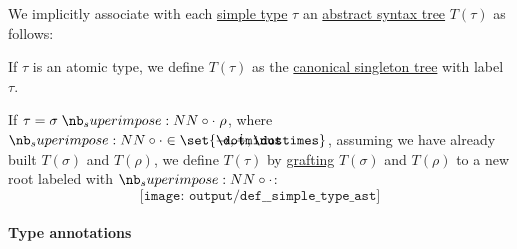 \begin{definition}\label{def:simple_type_ast}\mimprovised
  We implicitly associate with each \hyperref[def:simple_type]{simple type} \( \tau \) an \hyperref[con:abstract_syntax_tree]{abstract syntax tree} \( T(\tau) \) as follows:
  \begin{thmenum}
     If \( \tau \) is an atomic type, we define \( T(\tau) \) as the \hyperref[def:canonical_singleton_tree]{canonical singleton tree} with label \( \tau \).

     If \( \tau = \sigma \syncirc \rho \), where \( {\syncirc} \in \set{ \synimplies, \synplus, \syntimes } \), assuming we have already built \( T(\sigma) \) and \( T(\rho) \), we define \( T(\tau) \) by \hyperref[def:ordered_tree_grafting_product]{grafting} \( T(\sigma) \) and \( T(\rho) \) to a new root labeled with \( \syncirc \):
    \begin{equation*}
      \texttt{[image: output/def\_\_simple\_type\_ast]}
    \end{equation*}
  \end{thmenum}
\end{definition}

\paragraph{Type annotations}


